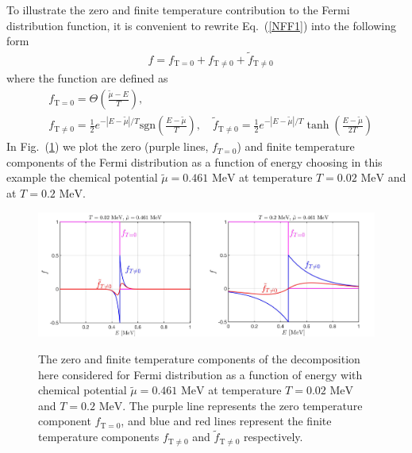 \documentclass[sn-mathphys,Numbered]{sn-jnl}
\newcommand*{\MeV}{\text{ MeV}}
\begin{document}
To illustrate the zero and finite temperature contribution to the Fermi distribution function, it is convenient to rewrite Eq.~(\ref{NFF1}) into the following form
\begin{align}
&f=f_{\mathrm{T=0}}+f_\mathrm{T\neq0}+\tilde f_\mathrm{T\neq0}
\end{align}
where the function are defined as
\begin{align}
&f_{\mathrm{T=0}}=\Theta\left(\frac{\widetilde\mu - E}{T}\right),\\ &f_\mathrm{T\neq0}=\frac{1}{2}e^{ - |E-\widetilde\mu|/T }\mathrm{sgn}\left(\frac{E-\widetilde\mu}{T}\right),\quad\tilde f_\mathrm{T\neq0}=\frac{1}{2}e^{ - |E-\widetilde\mu|/T }\tanh\left(\frac{E-\widetilde\mu}{2T}\right)
\end{align}
In Fig.~(\ref{Fermi_Component}) we plot the zero (purple lines, $f_{T=0}$) and finite temperature components of the Fermi distribution as a function of energy choosing in this example the chemical potential $\widetilde\mu=0.461\MeV$ at temperature $T=0.02\MeV$ and at $T=0.2\MeV$.

\begin{figure}[ht]
\centering
\includegraphics[width=0.5\textwidth]{./plot/FermiZeorFiniteTemperature}\includegraphics[width=0.5\textwidth]{./plot/FermiZeroFiniteTemperature002}
\caption{The zero and finite temperature components of the decomposition here considered for Fermi distribution as a function of energy with chemical potential $\widetilde\mu=0.461\MeV$ at temperature $T=0.02\MeV$ and $T=0.2\MeV$. The purple line represents the zero temperature component $f_{\mathrm{T}=0}$, and blue and red lines represent the finite temperature components $f_\mathrm{T\neq0}$ and $\tilde f_\mathrm{T\neq0}$ respectively. }
\label{Fermi_Component}
\end{figure}
\end{document}
